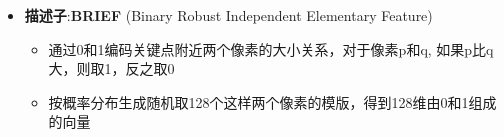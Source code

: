 \documentclass[../main.tex]{subfiles}
\begin{document}
\begin{enumerate}
\begin{itemize}
\begin{enumerate}
\begin{itemize}
\begin{itemize}
\begin{itemize}
                                        \end{itemize}
                                    \item \textbf{描述子}:\textbf{BRIEF} (Binary Robust Independent Elementary Feature)
                                        \begin{itemize}
                                            \item 通过0和1编码关键点附近两个像素的大小关系，对于像素p和q, 如果p比q大，则取1，反之取0
                                            \item 按概率分布生成随机取128个这样两个像素的模版，得到128维由0和1组成的向量
                                        \end{itemize}
                                \end{itemize}
                            

\end{itemize}
\end{enumerate}
\end{itemize}
\end{enumerate}
\end{document}
